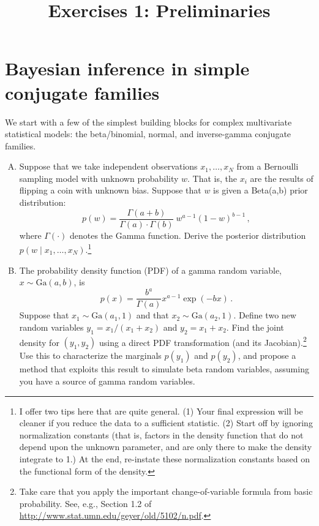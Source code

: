 \documentclass{mynotes}
\title[Lesson 1 $\cdot$ SDS 383D]{Exercises 1: Preliminaries}
\date{}  %
\begin{document}
\maketitle%

\section{Bayesian inference in simple conjugate families}

We start with a few of the simplest building blocks for complex multivariate statistical models: the beta/binomial, normal, and inverse-gamma conjugate families.

\begin{enumerate}[(A)]

\item Suppose that we take independent observations $x_1, \ldots, x_N$ from a Bernoulli sampling model with unknown probability $w$.  That is, the $x_i$ are the results of flipping a coin with unknown bias.  Suppose that $w$ is given a Beta(a,b) prior distribution:
$$
p(w) = \frac{\Gamma(a+b)}{\Gamma(a) \cdot \Gamma(b)} \ w^{a-1} (1-w)^{b-1} \, ,
$$
where $\Gamma(\cdot)$ denotes the Gamma function.  Derive the posterior distribution $p(w \mid x_1, \ldots, x_N)$.\footnote{I offer two tips here that are quite general.  (1) Your final expression will be cleaner if you reduce the data to a sufficient statistic.  (2) Start off by ignoring normalization constants (that is, factors in the density function that do not depend upon the unknown parameter, and are only there to make the density integrate to 1.)  At the end, re-instate these normalization constants based on the functional form of the density.}

\item The probability density function (PDF) of a gamma random variable, $x \sim \mbox{Ga}(a,b)$, is
$$
p(x) = \frac{b^a}{\Gamma(a)} x^{a-1} \exp(-bx) \, .
$$
Suppose that $x_1 \sim \mbox{Ga}(a_1,1)$ and that $x_2 \sim \mbox{Ga}(a_2,1)$.  Define two new random variables $y_1 = x_1/(x_1 + x_2)$ and $y_2 = x_1 + x_2$.  Find the joint density for $(y_1, y_2)$ using a direct PDF transformation (and its Jacobian).\footnote{Take care that you apply the important change-of-variable formula from basic probability.  See, e.g., Section 1.2 of \url{http://www.stat.umn.edu/geyer/old/5102/n.pdf}.}  Use this to characterize the  marginals $p(y_1)$ and $p(y_2)$, and propose a method that exploits this result to simulate beta random variables, assuming you have a source of gamma random variables.


\end{enumerate}
\end{document}
